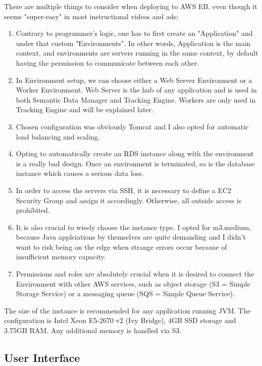 \bigbreak

There are multiple things to consider when deploying to AWS EB, even though it seems "super-easy" in most instructional videos and ads:

\begin{enumerate}
	\item Contrary to programmer's logic, one has to first create an "Application" and under that custom "Environments". In other words, Application is the main context, and environments are servers running in the same context, by default having the permission to communicate between each other.
	\item In Environment setup, we can choose either a Web Server Environment or a Worker Environment. Web Server is the hub of any application and is used in both Semantic Data Manager and Tracking Engine. Workers are only used in Tracking Engine and will be explained later.
	\item Chosen configuration was obviously Tomcat and I also opted for automatic load balancing and scaling.
	\item Opting to automatically create an RDS instance along with the environment is a really bad design. Once an environment is terminated, so is the database instance which causes a serious data loss.
	\item In order to access the servers via SSH, it is necessary to define a EC2 Security Group and assign it accordingly. Otherwise, all outside access is prohibited.
	\item It is also crucial to wisely choose the instance type. I opted for m3.medium, because Java applciations by themselves are quite demanding and I didn't want to risk being on the edge when strange errors occur because of insufficient memory capacity.
	\item Permissions and roles are absolutely crucial when it is desired to connect the Environment with other AWS services, such as object storage (S3 = Simple Storage Service) or a messaging queue (SQS = Simple Queue Service).
\end{enumerate}

 The size of the instance is recommended for any application running JVM. The configuration is Intel Xeon E5-2670 v2 (Ivy Bridge), 4GB SSD storage and 3.75GB RAM. Any additional memory is handled via S3.

\subsection{User Interface}

